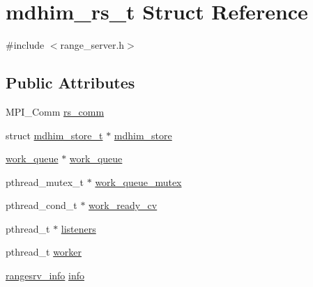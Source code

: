 \hypertarget{structmdhim__rs__t}{\section{mdhim\-\_\-rs\-\_\-t Struct Reference}
\label{d3/d34/structmdhim__rs__t}
}


{\ttfamily \#include $<$range\-\_\-server.\-h$>$}

\subsection*{Public Attributes}
\begin{DoxyCompactItemize}
\item 
M\-P\-I\-\_\-\-Comm \hyperlink{structmdhim__rs__t_a0ed34bdf133e1d59d83d44d0fda49683}{rs\-\_\-comm}
\item 
struct \hyperlink{structmdhim__store__t}{mdhim\-\_\-store\-\_\-t} $\ast$ \hyperlink{structmdhim__rs__t_aa393b01287a2253acff72c03cc5a83c5}{mdhim\-\_\-store}
\item 
\hyperlink{structwork__queue}{work\-\_\-queue} $\ast$ \hyperlink{structmdhim__rs__t_ab9b9e9145d08a9311917f42719937acc}{work\-\_\-queue}
\item 
pthread\-\_\-mutex\-\_\-t $\ast$ \hyperlink{structmdhim__rs__t_ab2c8635cf5b4ab05bdf8385960e3c490}{work\-\_\-queue\-\_\-mutex}
\item 
pthread\-\_\-cond\-\_\-t $\ast$ \hyperlink{structmdhim__rs__t_ab62cc2fae8553bb08e04f4365a94ec93}{work\-\_\-ready\-\_\-cv}
\item 
pthread\-\_\-t $\ast$ \hyperlink{structmdhim__rs__t_ad4c630a210666a4711cec6f6378c333b}{listeners}
\item 
pthread\-\_\-t \hyperlink{structmdhim__rs__t_a0d5b280f18a5ff536779911d65a50529}{worker}
\item 
\hyperlink{structrangesrv__info}{rangesrv\-\_\-info} \hyperlink{structmdhim__rs__t_a23b6bfa000c31bbee0e71c4b6fbed2e9}{info}
\end{DoxyCompactItemize}


